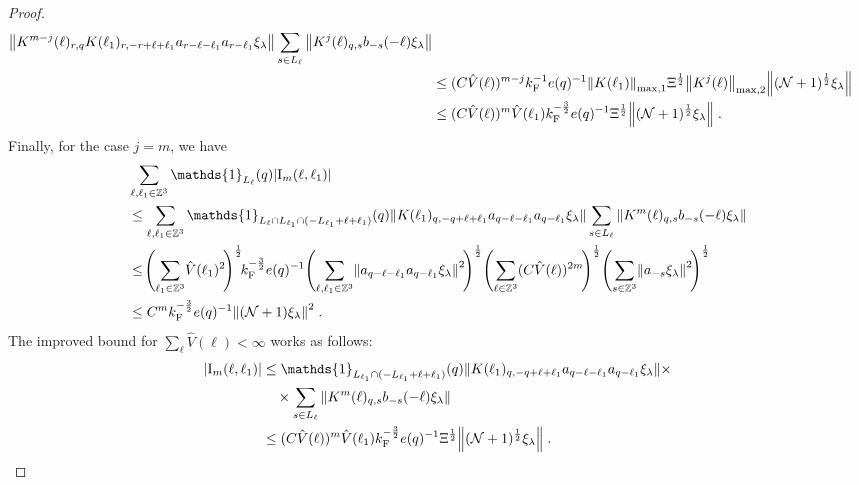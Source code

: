 \documentclass[12pt,a4paper]{article}
\numberwithin{equation}{section}
\newcommand{\1}{\mathbb{I}}
\newcommand{\F}{\mathrm{F}}
\newcommand{\I}{\mathrm{I}}
\newcommand{\kF}{k_\F}
\newcommand{\Zstar}{\mathbb{Z}^3} %
\newcommand{\Z}{\mathbb{Z}}
\newcommand{\NN}{\mathcal{N}}
\newcommand{\half}{\frac{1}{2}}
\theoremstyle{plain}
\theoremstyle{definition}
\theoremstyle{remark}
\theoremstyle{plain}
\theoremstyle{definition}
\theoremstyle{remark}
\begin{document}
\begin{proof}
\begin{align}
		\norm{ K^{m-j}(\ell)_{r,q} K(\ell_1)_{r,-r+\ell+\ell_1} a_{r-\ell-\ell_1} a_{r-\ell_1} \xi_\lambda}
		\sum_{s \in L_{\ell}}
		\norm{ K^j(\ell)_{q,s} b_{-s}(-\ell) \xi_\lambda }\nonumber\\
	&\leq (C \hat{V}(\ell))^{m-j} \kF^{-1} e(q)^{-1}
		\norm{K(\ell_1)}_{\max,1} \Xi^{\half}
		\norm{K^j(\ell)}_{\max,2}
		\norm{ (\NN+1)^\half \xi_\lambda} \nonumber\\
	&\leq (C \hat{V}(\ell))^m
		\hat{V}(\ell_1)
		\kF^{-\frac 32} e(q)^{-1} \Xi^\half
		\norm{ (\NN+1)^\half \xi_\lambda} \;. \label{eq:estEQ2152}
\end{align}
Finally, for the case $ j = m $, we have
\begin{align}
	&\sum_{\ell,\ell_1 \in \Zstar} \mathds{1}_{L_\ell}(q) |\I_m(\ell, \ell_1)| \nonumber\\
	&\leq \sum_{\ell,\ell_1 \in \Zstar} \mathds{1}_{L_\ell \cap L_{\ell_1} \cap (-L_{\ell_1} + \ell + \ell_1)}(q) \norm{K(\ell_1)_{q,-q+\ell+\ell_1} a_{q-\ell-\ell_1} a_{q-\ell_1} \xi_\lambda} 
		\sum\limits_{ s \in L_{\ell}}
		\norm{ K^m(\ell)_{q,s} b_{-s}(-\ell) \xi_\lambda }\nonumber\\
	&\leq \! \Bigg( \! \sum_{\ell_1 \in \Zstar} \! \hat{V}(\ell_1)^2 \! \Bigg)^{\half} 
		\! \kF^{-\frac 32} e(q)^{-1}
		\Bigg( \! \sum_{\ell,\ell_1 \in \Z^3} \! \norm{a_{q-\ell-\ell_1} a_{q-\ell_1}  \xi_\lambda}^2 \! \Bigg)^{\half}
		\Bigg( \! \sum_{\ell \in \Zstar} (C \hat{V}(\ell))^{2m} \! \Bigg)^{\half} 
		\Bigg( \! \sum\limits_{ s \in \Z^3} \! \norm{ a_{-s} \xi_\lambda }^2 \! \Bigg)^{\half} \nonumber\\
	&\leq C^m \kF^{-\frac 32} e(q)^{-1}
		\norm{(\NN+1) \xi_\lambda}^2 \;. \label{eq:estEQ2153_Coulomb}
\end{align}
The improved bound for $ \sum_\ell \hat{V}(\ell) < \infty $ works as follows:
\begin{align}
	|\I_m(\ell, \ell_1)|
	&\leq \mathds{1}_{L_{\ell_1} \cap (-L_{\ell_1} + \ell + \ell_1)}(q) \norm{K(\ell_1)_{q,-q+\ell+\ell_1} a_{q-\ell-\ell_1} a_{q-\ell_1} \xi_\lambda} \times  \label{eq:estEQ2153} \\
	& \quad \times
		\sum_{ s \in L_{\ell}}
		\norm{ K^m(\ell)_{q,s} b_{-s}(-\ell) \xi_\lambda }\nonumber\\
	&\leq (C \hat{V}(\ell))^m
		\hat{V}(\ell_1)
		\kF^{-\frac 32} e(q)^{-1} \Xi^\half
		\norm{(\NN+1)^\half\xi_\lambda} \;. \qedhere \nonumber
\end{align}
\end{proof}
\end{document}
